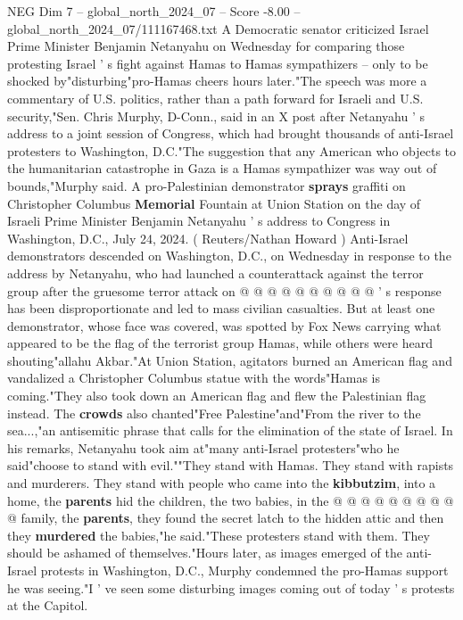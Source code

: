 \begin{textsample}{NEG Dim 7 – global\_north\_2024\_07 – Score -8.00 – global\_north\_2024\_07/111167468.txt}  \label{ex:f7_neg_119}
A Democratic senator criticized Israel Prime Minister Benjamin Netanyahu on Wednesday for comparing those protesting Israel ' s fight against Hamas to Hamas sympathizers -- only to be shocked by"disturbing"pro-Hamas cheers hours later."The speech was more a commentary of U.S. politics, rather than a path forward for Israeli and U.S. security,"Sen.
Chris Murphy, D-Conn., said in an X post after Netanyahu ' s address to a joint session of Congress, which had brought thousands of anti-Israel protesters to Washington, D.C."The suggestion that any American who objects to the humanitarian catastrophe in Gaza is a Hamas sympathizer was way out of bounds,"Murphy said.
A pro-Palestinian demonstrator \textbf{sprays} graffiti on Christopher Columbus \textbf{Memorial} Fountain at Union Station on the day of Israeli Prime Minister Benjamin Netanyahu ' s address to Congress in Washington, D.C., July 24, 2024. ( Reuters/Nathan Howard ) Anti-Israel demonstrators descended on Washington, D.C., on Wednesday in response to the address by Netanyahu, who had launched a counterattack against the terror group after the gruesome terror attack on @ @ @ @ @ @ @ @ @ @ ' s response has been disproportionate and led to mass civilian casualties.
But at least one demonstrator, whose face was covered, was spotted by Fox News carrying what appeared to be the flag of the terrorist group Hamas, while others were heard shouting"allahu Akbar."At Union Station, agitators burned an American flag and vandalized a Christopher Columbus statue with the words"Hamas is coming."They also took down an American flag and flew the Palestinian flag instead.
The \textbf{crowds} also chanted"Free Palestine"and"From the river to the sea...,"an antisemitic phrase that calls for the elimination of the state of Israel.
In his remarks, Netanyahu took aim at"many anti-Israel protesters"who he said"choose to stand with evil.""They stand with Hamas.
They stand with rapists and murderers.
They stand with people who came into the \textbf{kibbutzim}, into a home, the \textbf{parents} hid the children, the two babies, in the @ @ @ @ @ @ @ @ @ @ family, the \textbf{parents}, they found the secret latch to the hidden attic and then they \textbf{murdered} the babies,"he said."These protesters stand with them.
They should be ashamed of themselves."Hours later, as images emerged of the anti-Israel protests in Washington, D.C., Murphy condemned the pro-Hamas support he was seeing."I ' ve seen some disturbing images coming out of today ' s protests at the Capitol.

\end{textsample}
